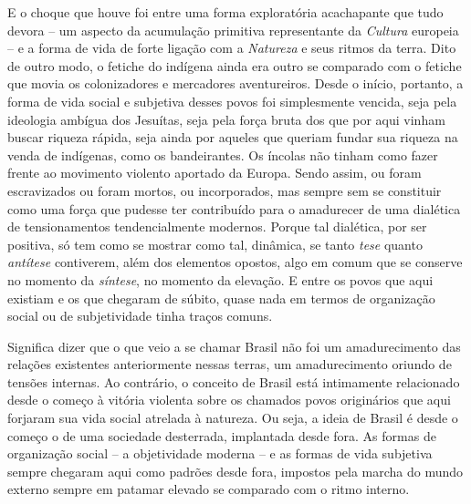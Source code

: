 {E o choque que houve foi entre uma forma exploratória acachapante que
tudo devora -- um aspecto da acumulação primitiva representante da
\emph{Cultura} europeia -- e a forma de vida de forte ligação com a
\emph{Natureza} e seus ritmos da terra. Dito de outro modo, o fetiche do
indígena ainda era outro se comparado com o fetiche que movia os
colonizadores e mercadores aventureiros. Desde o início, portanto, a
forma de vida social e subjetiva desses povos foi simplesmente vencida,
seja pela ideologia ambígua dos Jesuítas, seja pela força bruta dos que
por aqui vinham buscar riqueza rápida, seja ainda por aqueles que
queriam fundar sua riqueza na venda de indígenas, como os bandeirantes.
Os íncolas não tinham como fazer frente ao movimento violento aportado
da Europa. Sendo assim, ou foram escravizados ou foram mortos, ou
incorporados, mas sempre sem se constituir como uma força que pudesse
ter contribuído para o amadurecer de uma dialética de tensionamentos
tendencialmente modernos. Porque tal dialética, por ser positiva, só tem
como se mostrar como tal, dinâmica, se tanto \emph{tese} quanto
\emph{antítese} contiverem, além dos elementos opostos, algo em comum
que se conserve no momento da \emph{síntese}, no momento da elevação. E
entre os povos que aqui existiam e os que chegaram de súbito, quase nada
em termos de organização social ou de subjetividade tinha traços comuns.

Significa dizer que o que veio a se chamar Brasil não foi um
amadurecimento das relações existentes anteriormente nessas terras, um
amadurecimento oriundo de tensões internas. Ao contrário, o conceito de
Brasil está intimamente relacionado desde o começo à vitória violenta
sobre os chamados povos originários que aqui forjaram sua vida social
atrelada à natureza. Ou seja, a ideia de Brasil é desde o começo o de
uma sociedade desterrada, implantada desde fora. As formas de
organização social -- a objetividade moderna -- e as formas de vida
subjetiva sempre chegaram aqui como padrões desde fora, impostos pela
marcha do mundo externo sempre em patamar elevado se comparado com o
ritmo interno.

}
